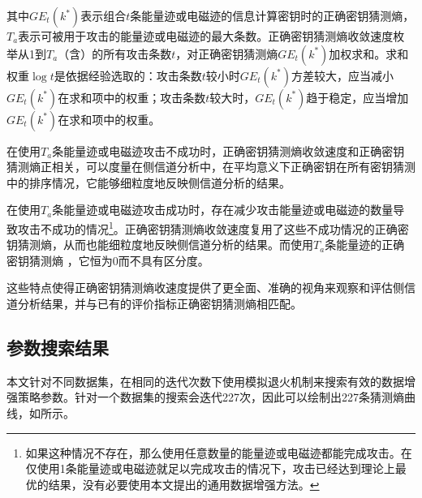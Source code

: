 {	\noindent 其中$GE_t(k^*)$表示组合$t$条能量迹或电磁迹的信息计算密钥时的正确密钥猜测熵，$T_a$表示可被用于攻击的能量迹或电磁迹的最大条数。正确密钥猜测熵收敛速度枚举从1到$T_a$（含）的所有攻击条数$t$，对正确密钥猜测熵$GE_t(k^*)$加权求和。求和权重$\log t$是依据经验选取的：攻击条数$t$较小时$GE_t(k^*)$方差较大，应当减小$GE_t(k^*)$在求和项中的权重；攻击条数$t$较大时，$GE_t(k^*)$趋于稳定，应当增加$GE_t(k^*)$在求和项中的权重。
	
	在使用$T_a$条能量迹或电磁迹攻击不成功时，正确密钥猜测熵收敛速度和正确密钥猜测熵正相关，可以度量在侧信道分析中，在平均意义下正确密钥在所有密钥猜测中的排序情况，它能够细粒度地反映侧信道分析的结果。
	
	在使用$T_a$条能量迹或电磁迹攻击成功时，存在减少攻击能量迹或电磁迹的数量导致攻击不成功的情况\footnote{如果这种情况不存在，那么使用任意数量的能量迹或电磁迹都能完成攻击。在仅使用1条能量迹或电磁迹就足以完成攻击的情况下，攻击已经达到理论上最优的结果，没有必要使用本文提出的通用数据增强方法。}。正确密钥猜测熵收敛速度复用了这些不成功情况的正确密钥猜测熵，从而也能细粒度地反映侧信道分析的结果。而使用$T_a$条能量迹的正确密钥猜测熵 ，它恒为0而不具有区分度。
	
	这些特点使得正确密钥猜测熵收速度提供了更全面、准确的视角来观察和评估侧信道分析结果，并与已有的评价指标正确密钥猜测熵相匹配。
	
	\subsection{参数搜索结果}
	本文针对不同数据集，在相同的迭代次数下使用模拟退火机制来搜索有效的数据增强策略参数。针对一个数据集的搜索会迭代227次，因此可以绘制出227条猜测熵曲线，如所示。
	
}
